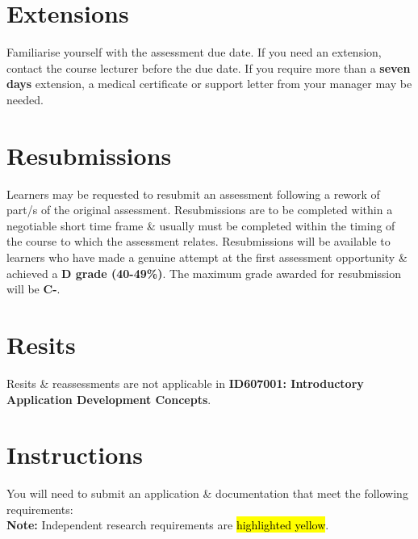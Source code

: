 \documentclass{article}
\begin{document}
\section*{Extensions}
Familiarise yourself with the assessment due date. If you need an extension, contact the course lecturer before the due date. If you require more than a \textbf{seven days} extension, a medical certificate or support letter from your manager may be needed.

\section*{Resubmissions}
Learners may be requested to resubmit an assessment following a rework of part/s of the original assessment. Resubmissions are to be completed within a negotiable short time frame \& usually must be completed within the timing of the course to which the assessment relates. Resubmissions will be available to learners who have made a genuine attempt at the first assessment opportunity \& achieved a \textbf{D grade (40-49\%)}. The maximum grade awarded for resubmission will be \textbf{C-}.

\section*{Resits}
Resits \& reassessments are not applicable in \textbf{ID607001: Introductory Application Development Concepts}. 

\newpage

\section*{Instructions}
You will need to submit an application \& documentation that meet the following requirements: \\

\textbf{Note:} Independent research requirements are \hl{highlighted yellow}.
\end{document}
